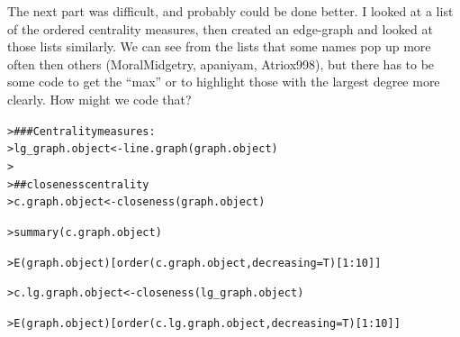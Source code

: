 \documentclass[12pt]{article}\usepackage[]{graphicx}\usepackage[]{color}
\makeatletter
\newcommand{\hlnum}[1]{\textcolor[rgb]{0.82,0.78,0.62}{#1}}%
\newcommand{\hlcom}[1]{\textcolor[rgb]{0.404,0.408,0.42}{#1}}%
\newcommand{\hlopt}[1]{\textcolor[rgb]{0.882,0.878,0.898}{#1}}%
\newcommand{\hlstd}[1]{\textcolor[rgb]{0.882,0.878,0.898}{#1}}%
\newcommand{\hlkwb}[1]{\textcolor[rgb]{0.902,0.675,0.196}{#1}}%
\newcommand{\hlkwc}[1]{\textcolor[rgb]{0.812,0.522,0.388}{#1}}%
\newcommand{\hlkwd}[1]{\textcolor[rgb]{0.733,0.388,0.812}{#1}}%
\newenvironment{kframe}{%
 \def\at@end@of@kframe{}%
 \ifinner\ifhmode%
  \def\at@end@of@kframe{\end{minipage}}%
  \begin{minipage}{\columnwidth}%
 \fi\fi%
 \def\FrameCommand##1{\hskip\@totalleftmargin \hskip-\fboxsep
 \colorbox{shadecolor}{##1}\hskip-\fboxsep
     \hskip-\linewidth \hskip-\@totalleftmargin \hskip\columnwidth}%
 \MakeFramed {\advance\hsize-\width
   \@totalleftmargin\z@ \linewidth\hsize
   \@setminipage}}%
 {\par\unskip\endMakeFramed%
 \at@end@of@kframe}
\newenvironment{knitrout}{}{} %
\makeatother
\begin{document}
\begin{flushleft}
The next part was difficult, and probably could be done better. I looked at a list of the ordered centrality measures, then created an edge-graph and looked at those lists similarly. We can see from the lists that some names pop up more often then others (MoralMidgetry, apaniyam, Atriox998), but there has to be some code to get the ``max'' or to highlight those with the largest degree more clearly. How might we code that? 

\begin{knitrout}
\color{fgcolor}\begin{kframe}
\begin{alltt}
\hlstd{> }\hlcom{### Centrality measures:}
\hlstd{> }\hlstd{lg_graph.object} \hlkwb{<-} \hlkwd{line.graph}\hlstd{(graph.object)}
\hlstd{> }
\hlstd{> }\hlcom{## closeness centrality}
\hlstd{> }\hlstd{c.graph.object} \hlkwb{<-} \hlkwd{closeness}\hlstd{(graph.object)}
\end{alltt}


{\ttfamily\noindent\bfseries\color{errorcolor}{\#\# Error in FUN(X[[i]], ...): as.edgelist.sna input must be an adjacency matrix/array, edgelist matrix, network, or sparse matrix, or list thereof.}}\begin{alltt}
\hlstd{> }\hlkwd{summary}\hlstd{(c.graph.object)}
\end{alltt}


{\ttfamily\noindent\bfseries\color{errorcolor}{\#\# Error in h(simpleError(msg, call)): error in evaluating the argument 'object' in selecting a method for function 'summary': object 'c.graph.object' not found}}\begin{alltt}
\hlstd{> }\hlkwd{E}\hlstd{(graph.object)[}\hlkwd{order}\hlstd{(c.graph.object,} \hlkwc{decreasing}\hlstd{=T)[}\hlnum{1}\hlopt{:}\hlnum{10}\hlstd{]]}
\end{alltt}


{\ttfamily\noindent\bfseries\color{errorcolor}{\#\# Error in order(c.graph.object, decreasing = T): object 'c.graph.object' not found}}\begin{alltt}
\hlstd{> }\hlstd{c.lg.graph.object} \hlkwb{<-} \hlkwd{closeness}\hlstd{(lg_graph.object)}
\end{alltt}


{\ttfamily\noindent\bfseries\color{errorcolor}{\#\# Error in FUN(X[[i]], ...): as.edgelist.sna input must be an adjacency matrix/array, edgelist matrix, network, or sparse matrix, or list thereof.}}\begin{alltt}
\hlstd{> }\hlkwd{E}\hlstd{(graph.object)[}\hlkwd{order}\hlstd{(c.lg.graph.object,} \hlkwc{decreasing}\hlstd{=T)[}\hlnum{1}\hlopt{:}\hlnum{10}\hlstd{]]}
\end{alltt}



\end{kframe}
\end{knitrout}
\end{flushleft}
\end{document}
